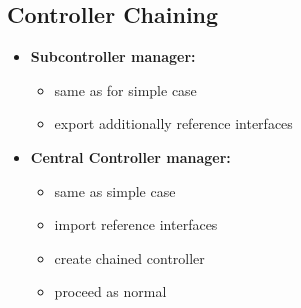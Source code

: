 \subsection{Controller Chaining}
\begin{itemize}
    \item \textbf{Subcontroller manager:}
    \begin{itemize}
        \item same as for simple case
        \item export additionally reference interfaces
    \end{itemize}
    \item \textbf{Central Controller manager:}
    \begin{itemize}
        \item same as simple case
        \item import reference interfaces
        \item create chained controller
        \item proceed as normal
    \end{itemize}
\end{itemize}